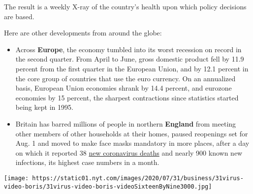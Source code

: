 The result is a weekly X-ray of the country's health upon which policy
decisions are based.

Here are other developments from around the globe:

\begin{itemize}
\item
  Across \textbf{Europe}, the economy tumbled into its worst recession
  on record in the second quarter. From April to June, gross domestic
  product fell by 11.9 percent from the first quarter in the European
  Union, and by 12.1 percent in the core group of countries that use the
  euro currency. On an annualized basis, European Union economies shrank
  by 14.4 percent, and eurozone economies by 15 percent, the sharpest
  contractions since statistics started being kept in 1995.
\item
  Britain has barred millions of people in northern \textbf{England}
  from meeting other members of other households at their homes, paused
  reopenings set for Aug. 1 and moved to make face masks mandatory in
  more places, after a day on which it reported 38
  \href{https://www.nytimes.com/interactive/2020/world/europe/united-kingdom-coronavirus-cases.html}{new
  coronavirus deaths} and nearly 900 known new infections, its highest
  case numbers in a month.
\end{itemize}

\texttt{[image: https://static01.nyt.com/images/2020/07/31/business/31virus-video-boris/31virus-video-boris-videoSixteenByNine3000.jpg]}

